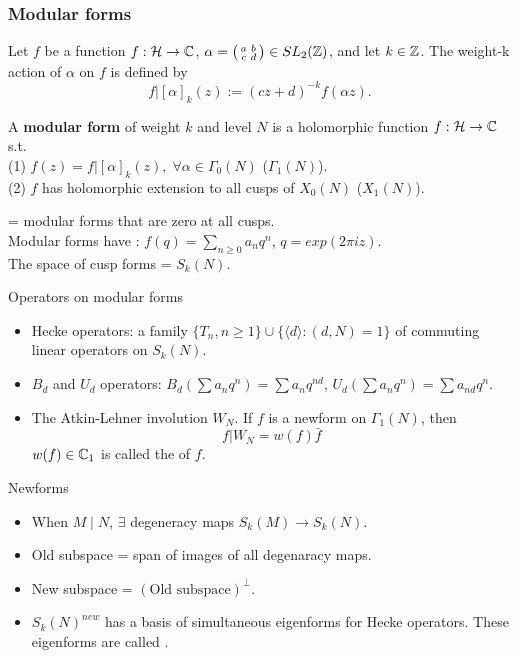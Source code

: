 \documentclass[handout]{beamer}
\begin{document}
\begin{frame}
\frametitle{Modular forms}
Let $f$ be a function $f: \mathcal{H} \to \mathbb{C}$,  $\alpha  = \left( \begin{smallmatrix}a&b\\c&d\end{smallmatrix}\right) \in SL_2(\mathbb{Z})$, and let $k \in \mathbb{Z}$. The weight-k action of $\alpha$ on $f$ is
defined by
\[
	f|[\alpha]_k(z) := (cz+d)^{-k}f(\alpha z).
\]

\pause

\begin{Def}
A \textbf{modular form} of weight $k$ and level $N$ is a holomorphic function $f: \mathcal{H} \to \mathbb{C}$ s.t. \\
(1) $f(z)  = f|[\alpha]_k(z), \; \forall \alpha \in \Gamma_0(N)$ ($\Gamma_1(N)$). \\
(2) $f$ has holomorphic extension to all cusps of $X_0(N)$ ($X_1(N)$). \\
\end{Def}

\pause

 = modular forms that are zero at all cusps. \\
Modular forms have : $f(q) = \sum_{n \geq 0} a_n q^n$, $q = exp(2\pi i z)$. \\
The space of cusp forms = $S_k(N)$. 

\end{frame}


\begin{frame}{Operators on modular forms}

\begin{itemize}
\item Hecke operators: a family $\{T_n, n \geq 1 \} \cup \{ \langle d \rangle: (d,N) = 1\}$ of commuting linear operators on $S_k(N)$. 

\item $B_d$ and $U_d$ operators: $B_d(\sum a_n q^n) = \sum a_{n} q^{nd}$, $U_d(\sum a_n q^n) = \sum a_{nd} q^{n}$.

\item The Atkin-Lehner involution $W_N$.  If $f$ is a newform on $\Gamma_1(N)$, then 
\[
	f | W_N = w(f) \bar{f}
\]
$w(f) \in \mathbb{C}_1$ is called the  of $f$. 

\end{itemize}

\end{frame}

\begin{frame}{Newforms}

\begin{itemize}
\item When $M \mid N$, $\exists$ degeneracy maps $S_k(M) \to S_k(N)$. 
\item Old subspace = span of images of all degenaracy maps. 
\item New subspace = $(\mbox{Old subspace})^{\perp}$.
\item $S_k(N)^{new}$ has a basis of simultaneous eigenforms for   Hecke operators. These eigenforms 
are called .
\end{itemize}

\end{frame}
\end{document}
